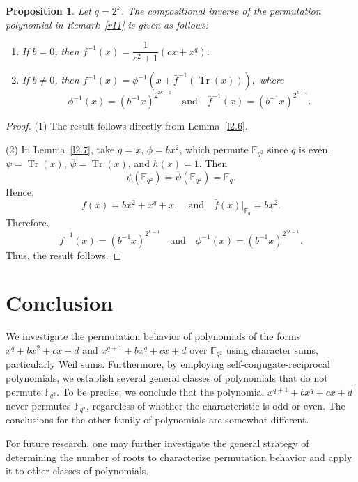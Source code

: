 \documentclass[12pt]{amsart}
\newtheorem{proposition}[theorem]{Proposition}
\theoremstyle{definition}
\theoremstyle{remark}
\numberwithin{equation}{section}
\begin{document}
\begin{proposition}
Let $q=2^k$. The compositional inverse of the permutation polynomial in Remark~\ref{r11} is given as follows:
\begin{enumerate}

\item If $b=0$, then
$
f^{-1}(x)=\dfrac{1}{c^2+1}\left(cx + x^q\right).
$
\item If $b\neq 0$, then
$
f^{-1}(x)=\phi^{-1}\!\left(x + \bar{f}^{-1}(\operatorname{Tr}(x))\right),
$
where
$$
\phi^{-1}(x) = \left(b^{-1}x\right)^{2^{2k-1}}
\quad \text{and} \quad
\bar{f}^{-1}(x) = \left(b^{-1}x\right)^{2^{k-1}}.
$$
\end{enumerate}
\end{proposition}
\begin{proof}

(1) The result follows directly from Lemma~\ref{l2.6}.

(2) In Lemma~\ref{l2.7}, take $g=x$, $\phi = b x^2$, which permute $\mathbb{F}_{q^2}$ since $q$ is even, $\psi = \operatorname{Tr}(x)$, $\overline{\psi} = \operatorname{Tr}(x)$, and $h(x)=1$. Then
\[
\psi(\mathbb{F}_{q^2}) = \overline{\psi}(\mathbb{F}_{q^2}) = \mathbb{F}_q.
\]
Hence,
\[
f(x)=b x^2 + x^q + x,
\quad \text{and} \quad
\bar{f}(x)\big|_{\mathbb{F}_q}= b x^2.
\]
Therefore,
\[
\bar{f}^{-1}(x) = (b^{-1}x)^{2^{k-1}}
\quad \text{and} \quad
\phi^{-1}(x)= (b^{-1}x)^{2^{2k-1}}.
\]
Thus, the result follows.

\end{proof}


\section{Conclusion}
We investigate the permutation behavior of polynomials of the forms $x^q+bx^2+cx+d$ and $x^{q+1}+bx^q+cx+d
$ over $\mathbb{F}_{q^2}$ using character sums, particularly Weil sums. Furthermore, by employing self-conjugate-reciprocal polynomials, we establish several general classes of polynomials that do not permute $\mathbb{F}_{q^2}$. To be precise, we conclude that the polynomial $
x^{q+1}+bx^q+cx+d
$ never permutes $\mathbb{F}_{q^2}$, regardless of whether the characteristic is odd or even. The conclusions for the other family of polynomials are somewhat different.

For future research, one may further investigate the general strategy of determining the number of roots to characterize permutation behavior and apply it to other classes of polynomials.
\end{document}
